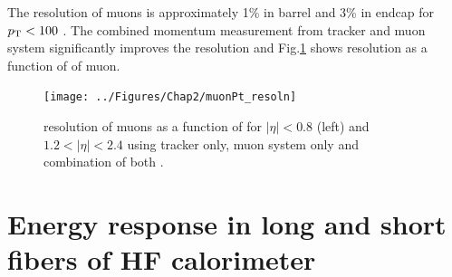 The \pt resolution of muons is approximately 1\% in barrel and 3\% in endcap for $p_{\mathrm{T}} < 100$ \gev \cite{Sirunyan:2018fpa}. The combined 
momentum measurement from tracker and muon system significantly improves the resolution and Fig.\ref{fig:muonPt_resoln} shows \pt 
resolution as a function of \pt of muon.

\begin{figure}[h!]
\centering
\texttt{[image: ../Figures/Chap2/muonPt\_resoln]}
\captionsetup{width=.95\linewidth}
\caption[Muon \pt resolution]{\pt resolution of muons as a function of \pt for $|\eta| < 0.8$ (left) and $1.2 < |\eta| < 2.4$ using 
tracker only, muon system only and combination of both \cite{Chatrchyan:2008aa}.}
\label{fig:muonPt_resoln}
\end{figure}


\section{Energy response in long and short fibers of HF calorimeter}
\label{chap2HFsec}

\newpage
